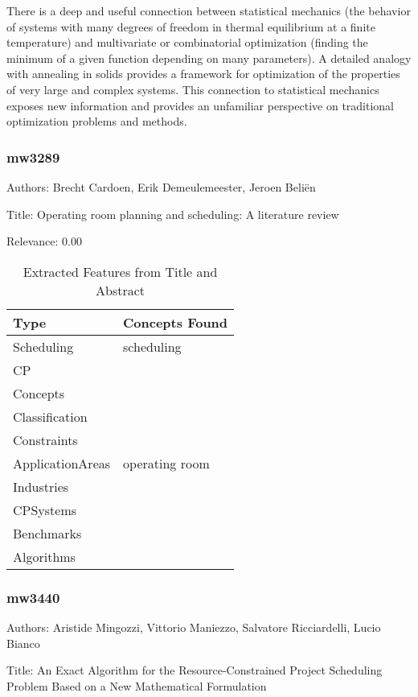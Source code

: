  There is a deep and useful connection between statistical mechanics (the behavior of systems with many degrees of freedom in thermal equilibrium at a finite temperature) and multivariate or combinatorial optimization (finding the minimum of a given function depending on many parameters). A detailed analogy with annealing in solids provides a framework for optimization of the properties of very large and complex systems. This connection to statistical mechanics exposes new information and provides an unfamiliar perspective on traditional optimization problems and methods. 

\subsubsection{mw3289}
\label{mw:mw3289}

Authors: Brecht Cardoen, Erik Demeulemeester, Jeroen Beliën

Title: Operating room planning and scheduling: A literature review

Relevance:  0.00

{\scriptsize
\begin{longtable}{p{2cm}p{20cm}}
\caption{Extracted Features from Title and Abstract}\\ \toprule
Type & Concepts Found\\ \midrule
\endhead
\bottomrule
\endfoot
Scheduling & scheduling\\ 
CP & \\ 
Concepts & \\ 
Classification & \\ 
Constraints & \\ 
ApplicationAreas & operating room\\ 
Industries & \\ 
CPSystems & \\ 
Benchmarks & \\ 
Algorithms & \\ 
\end{longtable}
}



\subsubsection{mw3440}
\label{mw:mw3440}

Authors: Aristide Mingozzi, Vittorio Maniezzo, Salvatore Ricciardelli, Lucio Bianco

Title: An Exact Algorithm for the Resource-Constrained Project Scheduling Problem Based on a New Mathematical Formulation

